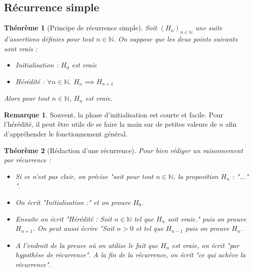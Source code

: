 \documentclass[french]{book}
\newcommand{\N}{\mathbb{N}}
\theoremstyle{plain}
\newtheorem{thm}{Théorème}[chapter]
\theoremstyle{definition}
\newtheorem{rmq}{Remarque}[chapter]
\theoremstyle{remark}
\begin{document}
\subsection{Récurrence simple}
\begin{thm}[Principe de récurrence simple]
	Soit $(H_n)_{n\in\N}$ une suite d'assertions définies pour tout $n\in\N$. On suppose que les deux points suivants sont vrais : \begin{itemize}
		\item Initialisation : $H_0$ est vraie
		\item Hérédité : $\forall n\in\N,\ H_n\implies H_{n+1}$
	\end{itemize}
	Alors pour tout $n\in\N$, $H_n$ est vraie.
\end{thm}
\begin{rmq}
	Souvent, la phase d'initialisation est courte et facile. Pour l'hérédité, il peut être utile de se faire la main sur de petites valeurs de $n$ afin d'appréhender le fonctionnement général.
\end{rmq}
\begin{thm}[Rédaction d'une récurrence]
	Pour bien rédiger un raisonnement par récurrence : 
	\begin{itemize}
		\item Si ce n'est pas clair, on précise "soit pour tout $n\in\N$, la proposition $H_n$ : "..." ".
		\item On écrit "Initialisation :" et on prouve $H_0$.
		\item Ensuite on écrit "Hérédité : Soit $n\in\N$ tel que $H_n$ soit vraie." puis on prouve $H_{n+1}$. On peut aussi écrire "Soit $n>0$ et tel que $H_{n-1}$ puis on prouve $H_n$.
		\item A l'endroit de la preuve où on utilise le fait que $H_n$ est vraie, on écrit "par hypothèse de récurrence". A la fin de la récurrence, on écrit "ce qui achève la récurrence".
	\end{itemize}
\end{thm}
\end{document}
